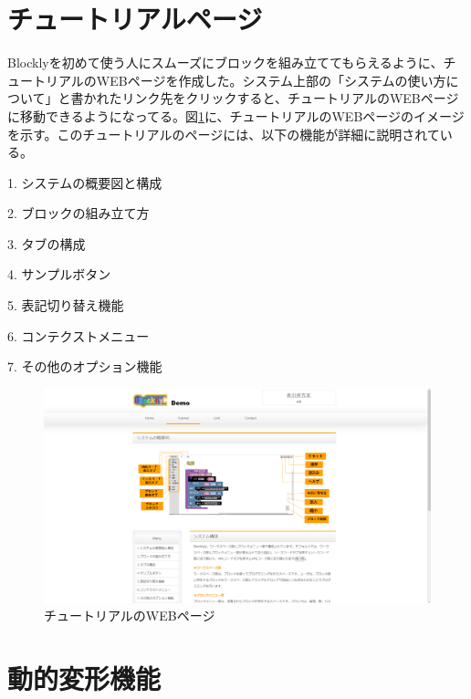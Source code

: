 \documentclass{risepaper}
\begin{document}
   \section{チュートリアルページ}
   
Blocklyを初めて使う人にスムーズにブロックを組み立ててもらえるように、チュートリアルのWEBページを作成した。システム上部の「システムの使い方について」と書かれたリンク先をクリックすると、チュートリアルのWEBページに移動できるようになってる。図\ref{fig:tutorial}に、チュートリアルのWEBページのイメージを示す。このチュートリアルのページには、以下の機能が詳細に説明されている。

1. システムの概要図と構成

2. ブロックの組み立て方

3. タブの構成

4. サンプルボタン

5. 表記切り替え機能

6. コンテクストメニュー

7. その他のオプション機能

\begin{figure}[h]
\begin{center}
\includegraphics[scale=0.5]{img/tutorial.PNG}
\caption{チュートリアルのWEBページ}%
\label{fig:tutorial}
\end{center}%
\end{figure}%


   \section{動的変形機能}
   
\end{document}
